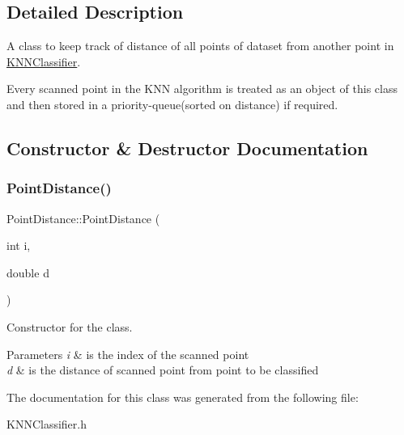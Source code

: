 \subsection{Detailed Description}
A class to keep track of distance of all points of dataset from another point in \hyperlink{classKNNClassifier}{K\+N\+N\+Classifier}. 

Every scanned point in the K\+NN algorithm is treated as an object of this class and then stored in a priority-\/queue(sorted on distance) if required. 

\subsection{Constructor \& Destructor Documentation}
\mbox{\label{classPointDistance_a172c423156ae61947c4521f691aae41c}} 
\subsubsection{\texorpdfstring{Point\+Distance()}{PointDistance()}}
{\footnotesize\ttfamily Point\+Distance\+::\+Point\+Distance (\begin{DoxyParamCaption}\item[{int}]{i,  }\item[{double}]{d }\end{DoxyParamCaption})\hspace{0.3cm}{\ttfamily [inline]}}



Constructor for the class. 


\begin{DoxyParams}{Parameters}
{\em i} & is the index of the scanned point \\
\hline
{\em d} & is the distance of scanned point from point to be classified \\
\hline
\end{DoxyParams}


The documentation for this class was generated from the following file\+:\begin{DoxyCompactItemize}
\item 
K\+N\+N\+Classifier.\+h\end{DoxyCompactItemize}
